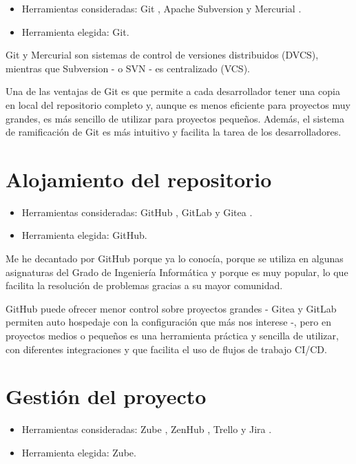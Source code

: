 \begin{itemize}
\tightlist
\item  
Herramientas consideradas: Git \citep{online:git}, Apache Subversion \citep{online:apache_subversion} 
y Mercurial \citep{online:mercurial}.
\item
  Herramienta elegida: Git.
\end{itemize}

Git y Mercurial son sistemas de control de versiones distribuidos (DVCS),
mientras que Subversion - o SVN - es centralizado (VCS). 

Una de las ventajas de Git es que permite a cada desarrollador tener una copia en local del repositorio 
completo y, aunque es menos eficiente para proyectos muy grandes, es más sencillo de utilizar para proyectos 
pequeños. Además, el sistema de ramificación de Git es más intuitivo y facilita la tarea de los desarrolladores. 


\section{Alojamiento del repositorio}\label{alojamiento_repositorio}

\begin{itemize}
\tightlist
\item
  Herramientas consideradas: GitHub \citep{online:github}, GitLab \citep{online:gitlab} y Gitea \citep{online:gitea}.
\item
  Herramienta elegida: GitHub. 
\end{itemize}

Me he decantado por GitHub porque ya lo conocía, porque se utiliza en 
algunas asignaturas del Grado de Ingeniería Informática y porque es muy 
popular, lo que facilita la resolución de problemas gracias a su mayor 
comunidad. 

GitHub puede ofrecer menor control sobre proyectos grandes - Gitea y GitLab 
permiten auto hospedaje con la configuración que más nos interese -, pero en 
proyectos medios o pequeños es una herramienta práctica y sencilla de 
utilizar, con diferentes integraciones y que facilita el uso de flujos 
de trabajo CI/CD. 


\section{Gestión del proyecto}\label{gestion_del_proyecto}

\begin{itemize}
\tightlist
\item
  Herramientas consideradas: Zube \citep{online:zube}, ZenHub \citep{online:zenhub}, Trello \citep{online:trello} y Jira \citep{online:jira}. 
\item
  Herramienta elegida: Zube.
\end{itemize}

